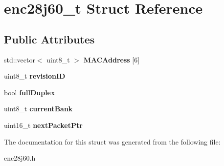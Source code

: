 \hypertarget{structenc28j60__t}{}\section{enc28j60\+\_\+t Struct Reference}
\label{structenc28j60__t}
\subsection*{Public Attributes}
\begin{DoxyCompactItemize}
\item 
\mbox{\label{structenc28j60__t_a657dad5c4c332641d1b43f4bfb767242}} 
std\+::vector$<$ uint8\+\_\+t $>$ {\bfseries M\+A\+C\+Address} \mbox{[}6\mbox{]}
\item 
\mbox{\label{structenc28j60__t_ada7729afae8752ce121d1c113823dbab}} 
uint8\+\_\+t {\bfseries revision\+ID}
\item 
\mbox{\label{structenc28j60__t_a606c78d2b4ecbad4bf211c8fd0f5b8d0}} 
bool {\bfseries full\+Duplex}
\item 
\mbox{\label{structenc28j60__t_aa1da4572ba169749318a0ac87c4df06a}} 
uint8\+\_\+t {\bfseries current\+Bank}
\item 
\mbox{\label{structenc28j60__t_a70a59370e15b65d068cfd2b7c401aa97}} 
uint16\+\_\+t {\bfseries next\+Packet\+Ptr}
\end{DoxyCompactItemize}


The documentation for this struct was generated from the following file\+:\begin{DoxyCompactItemize}
\item 
enc28j60.\+h\end{DoxyCompactItemize}
